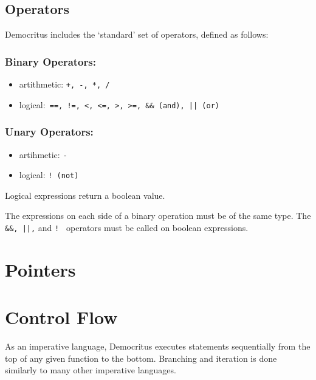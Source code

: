 	\iffalse
	\subsection{Modifiers}
		Information about atomic and pointers here.
	\fi

 	\subsection{Operators}
		
		Democritus includes the `standard' set of operators, defined as follows:

		\subsubsection{Binary Operators:}
		\begin{itemize}
			\item artithmetic: \texttt{+, -, *, /}
			\item logical:\verb^ ==, !=, <, <=, >, >=, && (and), || (or) ^ 
		\end{itemize}

		\subsubsection{Unary Operators:}
		\begin{itemize}
			\item artihmetic: \texttt{-}
			\item logical: \texttt{! (not)}
		\end{itemize}

		\noindent
		Logical expressions return a boolean value.

		\medskip \noindent
		The expressions on each side of a binary operation must be of the same type. The \verb^ &&, ||,^ and \verb^! ^ operators must be called on boolean expressions.

\section{Pointers}

\section{Control Flow}
	As an imperative language, Democritus executes statements sequentially from the top of any given function to the bottom. Branching and iteration is done similarly to many other imperative languages.

